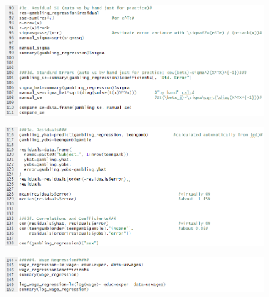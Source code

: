 \documentclass[12pt, letterpaper]{article}
\theoremstyle{definition}
\numberwithin{equation}{section}
\newcommand{\+}[1]{+_{\scalebox{.375}{#1}}}
\newcommand{\1}{\mathbbm{1}}
\begin{document}
\begin{figure}[H]
	\centering
	\includegraphics[width=14cm]{Gambling R Code 5}
\end{figure}
\begin{figure}[H]
	\centering
	\includegraphics[width=14cm]{Gambling R Code 6}
\end{figure}
\begin{figure}[H]
	\centering
	\includegraphics[width=14cm]{Gambling R Code 7}
\end{figure}
\end{document}
